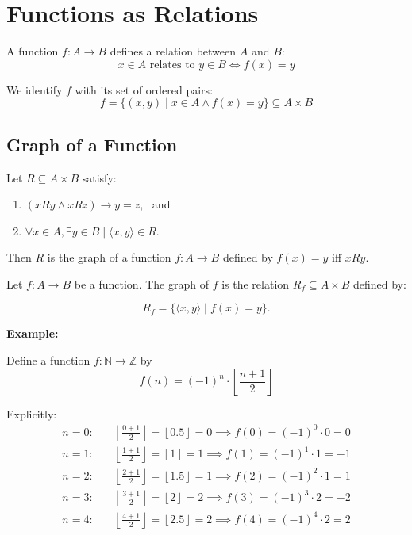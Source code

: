 \documentclass[12pt,a4paper,openany]{article}
\begin{document}
\section{Functions as Relations}

A function $f: A \to B$ defines a relation between $A$ and $B$:
\[
x \in A \text{ relates to } y \in B \iff f(x) = y
\]

We identify $f$ with its set of ordered pairs:
\[
f = \{(x, y) \mid x \in A \land f(x) = y\} \subseteq A \times B
\]

\subsection{Graph of a Function}

Let $R \subseteq A \times B$ satisfy:

\begin{enumerate}
\item $(xRy \land xRz) \to y = z$, \ and
\item $\forall x \in A, \exists y \in B \mid \langle x, y \rangle \in R$.
\end{enumerate}

Then $R$ is the graph of a function $f : A \to B$ defined by $f(x) = y$ iff $xRy$.

Let $f : A \to B$ be a function. The graph of $f$ is the relation $R_f \subseteq A \times B$ defined by:

\[
R_f = \{ \langle x, y \rangle \mid f(x) = y \}.
\]

\textbf{Example:}

Define a function $f : \mathbb{N} \to \mathbb{Z}$ by
\[
f(n) = (-1)^n \cdot \left\lfloor \frac{n+1}{2} \right\rfloor
\]

Explicitly:
\[
\begin{aligned}
n = 0: & \quad \left\lfloor \frac{0+1}{2} \right\rfloor = \left\lfloor 0.5 \right\rfloor = 0 \implies f(0) = (-1)^0 \cdot 0 = 0 \\
n = 1: & \quad \left\lfloor \frac{1+1}{2} \right\rfloor = \left\lfloor 1 \right\rfloor = 1 \implies f(1) = (-1)^1 \cdot 1 = -1 \\
n = 2: & \quad \left\lfloor \frac{2+1}{2} \right\rfloor = \left\lfloor 1.5 \right\rfloor = 1 \implies f(2) = (-1)^2 \cdot 1 = 1 \\
n = 3: & \quad \left\lfloor \frac{3+1}{2} \right\rfloor = \left\lfloor 2 \right\rfloor = 2 \implies f(3) = (-1)^3 \cdot 2 = -2 \\
n = 4: & \quad \left\lfloor \frac{4+1}{2} \right\rfloor = \left\lfloor 2.5 \right\rfloor = 2 \implies f(4) = (-1)^4 \cdot 2 = 2
\end{aligned}
\]
\end{document}
